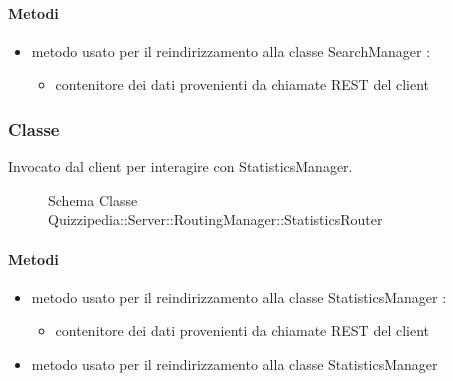 \paragraph{Metodi}
\begin{itemize}
\item {}
\newline
metodo usato per il reindirizzamento alla classe SearchManager
\newline
{} :
\begin{itemize}
\item {}
\newline
contenitore dei dati provenienti da chiamate REST del client
\end{itemize}
\end{itemize}
\subsubsection{Classe }
Invocato dal client per interagire con StatisticsManager.
\begin{figure}[H]
\centering
\noindent{}
\caption[Schema Classe StatisticsRouter]{Schema Classe Quizzipedia::Server::RoutingManager::StatisticsRouter}
\end{figure}
\paragraph{Metodi}
\begin{itemize}
\item {}
\newline
metodo usato per il reindirizzamento alla classe StatisticsManager
\newline
{} :
\begin{itemize}
\item {}
\newline
contenitore dei dati provenienti da chiamate REST del client
\end{itemize}
\item {}
\newline
metodo usato per il reindirizzamento alla classe StatisticsManager
\newline
\end{itemize}
